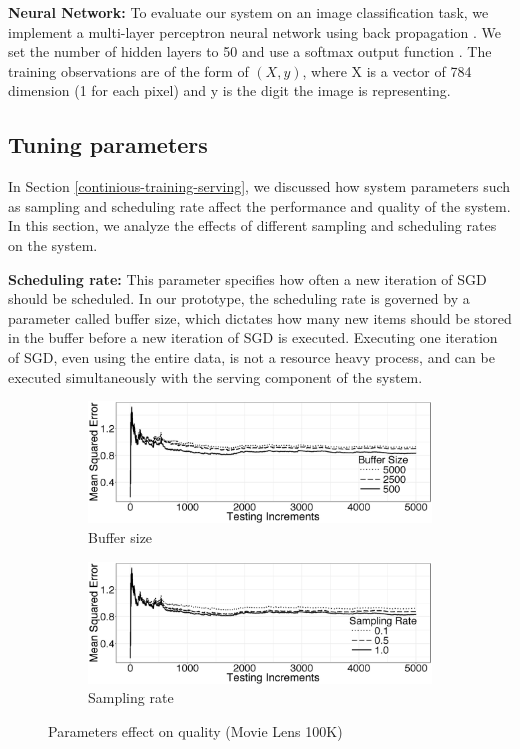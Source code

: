 \documentclass{vldb}
\begin{document}
\textbf{Neural Network:} To evaluate our system on an image classification task, we implement a multi-layer perceptron neural network using back propagation \cite{collobert2004links}.
We set the number of hidden layers to 50 and use a softmax output function \cite{bishop2006pattern}.
The training observations are of the form of \textit{\((X,y)\)}, where X is a vector of 784 dimension (1 for each pixel) and y is the digit the image is representing.

\subsection{Tuning parameters} \label{tuning}
In Section \ref{continious-training-serving}, we discussed how system parameters such as sampling and scheduling rate affect the performance and quality of the system.
In this section, we analyze the effects of different sampling and scheduling rates on the system.

\textbf{Scheduling rate:} This parameter specifies how often a new iteration of SGD should be scheduled. 
In our prototype, the scheduling rate is governed by a parameter called buffer size, which dictates how many new items should be stored in the buffer before a new iteration of SGD is executed. 
Executing one iteration of SGD, even using the entire data, is not a resource heavy process, and can be executed simultaneously with the serving component of the system. 

\begin{figure}[h]
\begin{subfigure}{\columnwidth}
\centering
\includegraphics[width=\columnwidth]{../images/experiment-results/movie-lens-buffer-quality-improved.eps}
\caption{Buffer size}
\label{fig:movie-lens-100k-buffer-size-mse}
\end{subfigure}
\begin{subfigure}{\columnwidth}
\centering
\includegraphics[width=\columnwidth]{../images/experiment-results/movie-lens-sampling-quality-improved.eps}
\caption{Sampling rate}
\label{fig:movie-lens-100k-sample-rate}
\end{subfigure}
\vspace{2mm}
\caption{Parameters effect on quality (Movie Lens 100K)}
\end{figure}
\end{document}
